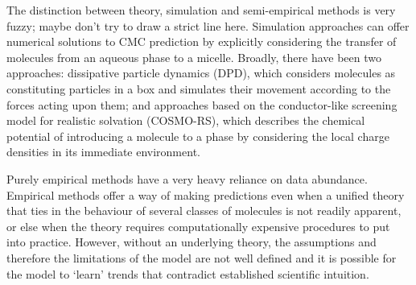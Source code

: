The distinction between theory, simulation and semi-empirical methods is very
fuzzy; maybe don't try to draw a strict line here. Simulation approaches can
offer numerical solutions to CMC prediction by explicitly considering the
transfer of molecules from an aqueous phase to a micelle. Broadly, there have
been two approaches: dissipative particle dynamics (DPD), which considers
molecules as constituting particles in a box and simulates their movement
according to the forces acting upon them; and approaches based on the conductor-like
screening model for realistic solvation (COSMO-RS), which describes the chemical potential
of introducing a molecule to a phase by considering the local charge densities in its
immediate environment.

Purely empirical methods have a very heavy reliance on data abundance. Empirical
methods offer a way of making predictions even when a unified theory that ties
in the behaviour of several classes of molecules is not readily apparent, or
else when the theory requires computationally expensive procedures to put into
practice. However, without an underlying theory, the assumptions and therefore
the limitations of the model are not well defined and it is possible for the
model to `learn' trends that contradict established scientific intuition.
